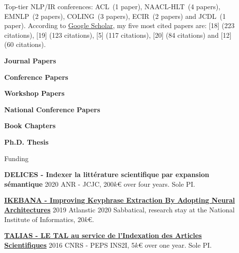 \documentclass[11pt,a4paper]{article}
\begin{document}
\begin{itemize}
Top-tier NLP/IR conferences:  ACL~(1 paper), NAACL-HLT~(4 papers), EMNLP~(2 papers), COLING~(3 papers), ECIR~(2 papers) and JCDL~(1 paper).
%
%
According to \href{https://scholar.google.com/citations?user=Vk68rbkAAAAJ}{Google Scholar}, my five most cited papers are: [18] {\small (223 citations)}, [19] {\small (123 citations)}, [5] {\small (117 citations)}, [20] {\small (84 citations)} and [12] {\small (60 citations)}.


\vspace{1em}

\nocite{*}

\textbf{Journal Papers}
\printbibliography[heading=none,type=article]


\textbf{Conference Papers}
\printbibliography[heading=none,type=inproceedings,keyword=intConf]

\textbf{Workshop Papers}
\printbibliography[heading=none,type=inproceedings,keyword=workshop]

\textbf{National Conference Papers}
\printbibliography[heading=none,type=inproceedings,keyword=natConf]

\newpage

\textbf{Book Chapters}
\printbibliography[heading=none,type=inbook]

\textbf{Ph.D. Thesis}
\printbibliography[heading=none,type=thesis]

\item[Funding]

\textbf{DELICES - Indexer la littérature scientifique par expansion sémantique} \hfill 2020 \newline
ANR - JCJC, 200$k$\euro{} over four years. Sole PI.

\href{https://ikebana-project.github.io/}{\textbf{IKEBANA - Improving Keyphrase Extraction By Adopting Neural
Architectures}} \hfill 2019 \newline
Atlanstic 2020 Sabbatical, research stay at the National Institute of Informatics, 20$k$\euro{}.

\href{http://boudinfl.github.io/talias/}{\textbf{TALIAS - LE TAL au service de
l'Indexation des Articles Scientifiques}} \hfill 2016 \newline
CNRS - PEPS INS2I, 5$k$\euro{} over one year. Sole PI.


\end{itemize}
\end{document}

